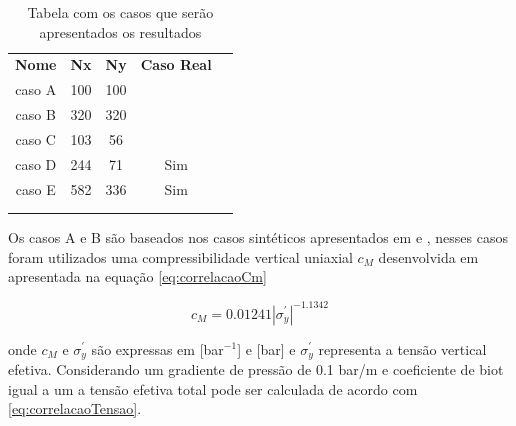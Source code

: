 \begin{table}[]
    \label{tab:descricaoModelos}
    \caption{Tabela com os casos que serão apresentados os resultados}
    \centering
    \begin{tabular}{ccccl}
    \cline{1-4}
    \multicolumn{1}{|c|}{\textbf{Nome}} & \multicolumn{1}{c|}{\textbf{Nx}} & \multicolumn{1}{c|}{\textbf{Ny}} & \multicolumn{1}{c|}{\textbf{Caso Real}} &  \\ \cline{1-4}
    \multicolumn{1}{|c|}{caso A}        & \multicolumn{1}{c|}{100}         & \multicolumn{1}{c|}{100}         & \multicolumn{1}{c|}{}                   &  \\ \cline{1-4}
    \multicolumn{1}{|c|}{caso B}        & \multicolumn{1}{c|}{320}         & \multicolumn{1}{c|}{320}         & \multicolumn{1}{c|}{}                   &  \\ \cline{1-4}
    \multicolumn{1}{|c|}{caso C}        & \multicolumn{1}{c|}{103}         & \multicolumn{1}{c|}{56}          & \multicolumn{1}{c|}{}                   &  \\ \cline{1-4}
    \multicolumn{1}{|c|}{caso D}        & \multicolumn{1}{c|}{244}         & \multicolumn{1}{c|}{71}          & \multicolumn{1}{c|}{Sim}                &  \\ \cline{1-4}
    \multicolumn{1}{|c|}{caso E}        & \multicolumn{1}{c|}{582}         & \multicolumn{1}{c|}{336}         & \multicolumn{1}{c|}{Sim}                &  \\ \cline{1-4}
    \multicolumn{1}{l}{}                & \multicolumn{1}{l}{}             & \multicolumn{1}{l}{}             & \multicolumn{1}{l}{}                    &  \\
    \multicolumn{1}{l}{}                & \multicolumn{1}{l}{}             & \multicolumn{1}{l}{}             & \multicolumn{1}{l}{}                    & 
    \end{tabular}
\end{table}


Os casos A e B são baseados nos casos sintéticos apresentados em \cite{casteletto} e \cite{irina}, nesses casos foram utilizados
uma compressibilidade vertical uniaxial $c_M$ desenvolvida em \cite{correlacaoE} apresentada na equação \ref{eq:correlacaoCm}

\begin{equation} \label{eq:correlacaoCm}
    c_M = 0.01241 |\sigma_y^\prime|^{-1.1342}
\end{equation}

onde $c_M$ e $\sigma_y^\prime$ são expressas em [bar$^{-1}$] e [bar] e  $\sigma_y^\prime$ representa a tensão vertical efetiva.
Considerando um gradiente de pressão de 0.1 bar/m e coeficiente de biot igual a um a tensão efetiva total pode ser calculada de acordo com \ref{eq:correlacaoTensao}.




